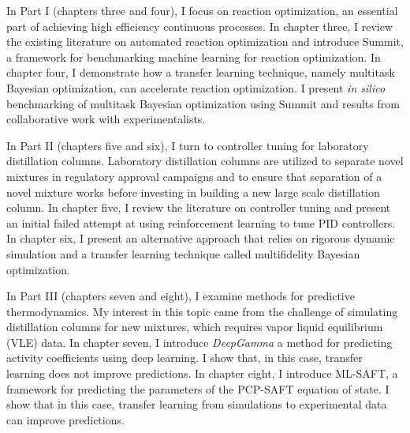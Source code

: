 In Part I (chapters three and four), I focus on reaction optimization, an essential part of achieving high efficiency continuous processes. In chapter three, I review the existing literature on automated reaction optimization and introduce Summit, a framework for benchmarking machine learning for reaction optimization.  In chapter four, I demonstrate how a transfer learning technique, namely multitask Bayesian optimization, can accelerate reaction optimization. I present \textit{in silico} benchmarking of multitask Bayesian optimization using Summit and results from collaborative work with experimentalists.

In Part II (chapters five and six), I turn to controller tuning for laboratory distillation columns. Laboratory distillation columns are utilized to separate novel mixtures in regulatory approval campaigns and to ensure that separation of a novel mixture works before investing in building a new large scale distillation column. In chapter five, I review the literature on controller tuning and present an initial failed attempt at using reinforcement learning to tune PID controllers. In chapter six, I present an alternative approach that relies on rigorous dynamic simulation and a transfer learning technique called multifidelity Bayesian optimization.

In Part III (chapters seven and eight), I examine methods for predictive thermodynamics. My interest in this topic came from the challenge of simulating distillation columns for new mixtures, which requires vapor liquid equilibrium (VLE) data. In chapter seven, I introduce \textit{DeepGamma} a method for predicting activity coefficients using deep learning. I show that, in this case, transfer learning does not improve predictions. In chapter eight, I introduce ML-SAFT, a framework for predicting the parameters of the PCP-SAFT equation of state. I show that in this case, transfer learning from simulations to experimental data can improve predictions.





